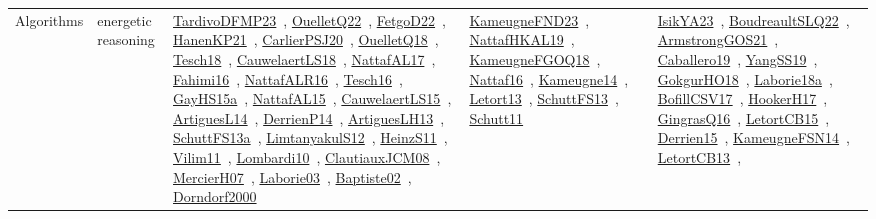 {\begin{longtable}{lp{3cm}>{\raggedright\arraybackslash}p{6cm}>{\raggedright\arraybackslash}p{6cm}>{\raggedright\arraybackslash}p{8cm}}
Algorithms & energetic reasoning & \href{../works/TardivoDFMP23.pdf}{TardivoDFMP23}~\cite{TardivoDFMP23}, \href{../works/OuelletQ22.pdf}{OuelletQ22}~\cite{OuelletQ22}, \href{../works/FetgoD22.pdf}{FetgoD22}~\cite{FetgoD22}, \href{../works/HanenKP21.pdf}{HanenKP21}~\cite{HanenKP21}, \href{../works/CarlierPSJ20.pdf}{CarlierPSJ20}~\cite{CarlierPSJ20}, \href{../works/OuelletQ18.pdf}{OuelletQ18}~\cite{OuelletQ18}, \href{../works/Tesch18.pdf}{Tesch18}~\cite{Tesch18}, \href{../works/CauwelaertLS18.pdf}{CauwelaertLS18}~\cite{CauwelaertLS18}, \href{../works/NattafAL17.pdf}{NattafAL17}~\cite{NattafAL17}, \href{../works/Fahimi16.pdf}{Fahimi16}~\cite{Fahimi16}, \href{../works/NattafALR16.pdf}{NattafALR16}~\cite{NattafALR16}, \href{../works/Tesch16.pdf}{Tesch16}~\cite{Tesch16}, \href{../works/GayHS15a.pdf}{GayHS15a}~\cite{GayHS15a}, \href{../works/NattafAL15.pdf}{NattafAL15}~\cite{NattafAL15}, \href{../works/CauwelaertLS15.pdf}{CauwelaertLS15}~\cite{CauwelaertLS15}, \href{../works/ArtiguesL14.pdf}{ArtiguesL14}~\cite{ArtiguesL14}, \href{../works/DerrienP14.pdf}{DerrienP14}~\cite{DerrienP14}, \href{../works/ArtiguesLH13.pdf}{ArtiguesLH13}~\cite{ArtiguesLH13}, \href{../works/SchuttFS13a.pdf}{SchuttFS13a}~\cite{SchuttFS13a}, \href{../works/LimtanyakulS12.pdf}{LimtanyakulS12}~\cite{LimtanyakulS12}, \href{../works/HeinzS11.pdf}{HeinzS11}~\cite{HeinzS11}, \href{../works/Vilim11.pdf}{Vilim11}~\cite{Vilim11}, \href{../works/Lombardi10.pdf}{Lombardi10}~\cite{Lombardi10}, \href{../works/ClautiauxJCM08.pdf}{ClautiauxJCM08}~\cite{ClautiauxJCM08}, \href{../works/MercierH07.pdf}{MercierH07}~\cite{MercierH07}, \href{../works/Laborie03.pdf}{Laborie03}~\cite{Laborie03}, \href{../works/Baptiste02.pdf}{Baptiste02}~\cite{Baptiste02}, \href{../works/Dorndorf2000.pdf}{Dorndorf2000}~\cite{Dorndorf2000} & \href{../works/KameugneFND23.pdf}{KameugneFND23}~\cite{KameugneFND23}, \href{../works/NattafHKAL19.pdf}{NattafHKAL19}~\cite{NattafHKAL19}, \href{../works/KameugneFGOQ18.pdf}{KameugneFGOQ18}~\cite{KameugneFGOQ18}, \href{../works/Nattaf16.pdf}{Nattaf16}~\cite{Nattaf16}, \href{../works/Kameugne14.pdf}{Kameugne14}~\cite{Kameugne14}, \href{../works/Letort13.pdf}{Letort13}~\cite{Letort13}, \href{../works/SchuttFS13.pdf}{SchuttFS13}~\cite{SchuttFS13}, \href{../works/Schutt11.pdf}{Schutt11}~\cite{Schutt11} & \href{../works/IsikYA23.pdf}{IsikYA23}~\cite{IsikYA23}, \href{../works/BoudreaultSLQ22.pdf}{BoudreaultSLQ22}~\cite{BoudreaultSLQ22}, \href{../works/ArmstrongGOS21.pdf}{ArmstrongGOS21}~\cite{ArmstrongGOS21}, \href{../works/Caballero19.pdf}{Caballero19}~\cite{Caballero19}, \href{../works/YangSS19.pdf}{YangSS19}~\cite{YangSS19}, \href{../works/GokgurHO18.pdf}{GokgurHO18}~\cite{GokgurHO18}, \href{../works/Laborie18a.pdf}{Laborie18a}~\cite{Laborie18a}, \href{../works/BofillCSV17.pdf}{BofillCSV17}~\cite{BofillCSV17}, \href{../works/HookerH17.pdf}{HookerH17}~\cite{HookerH17}, \href{../works/GingrasQ16.pdf}{GingrasQ16}~\cite{GingrasQ16}, \href{../works/LetortCB15.pdf}{LetortCB15}~\cite{LetortCB15}, \href{../works/Derrien15.pdf}{Derrien15}~\cite{Derrien15}, \href{../works/KameugneFSN14.pdf}{KameugneFSN14}~\cite{KameugneFSN14}, \href{../works/LetortCB13.pdf}{LetortCB13}~\cite{LetortCB13}, 
\end{longtable}}
